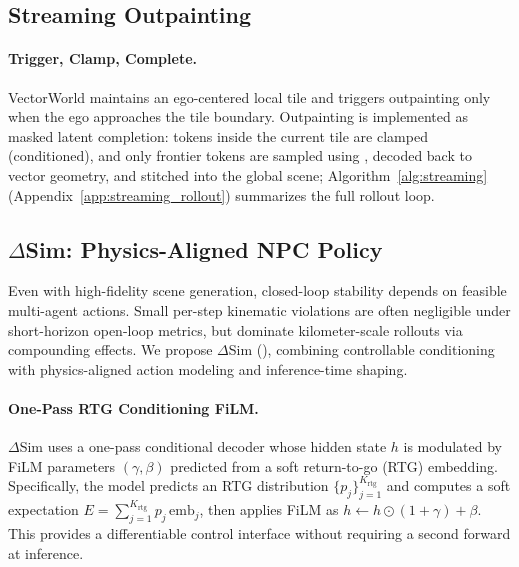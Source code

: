 \documentclass{article}
\theoremstyle{plain}
\theoremstyle{definition}
\theoremstyle{remark}
\begin{document}
\subsection{Streaming Outpainting}
\label{sec:streaming}

\paragraph{Trigger, Clamp, Complete.}
VectorWorld maintains an ego-centered local tile and triggers outpainting only when the ego approaches the tile boundary.
Outpainting is implemented as masked latent completion:
tokens inside the current tile are clamped (conditioned), and only frontier tokens are sampled using , decoded back to vector geometry, and stitched into the global scene; Algorithm~\ref{alg:streaming} (Appendix~\ref{app:streaming_rollout}) summarizes the full rollout loop.

\subsection{\(\Delta\)Sim: Physics-Aligned NPC Policy}
\label{sec:deltasim}

Even with high-fidelity scene generation, closed-loop stability depends on feasible multi-agent actions.
Small per-step kinematic violations are often negligible under short-horizon open-loop metrics, but dominate kilometer-scale rollouts via compounding effects. We propose \(\Delta\)Sim (), combining controllable conditioning with physics-aligned action modeling and inference-time shaping.

\paragraph{One-Pass RTG Conditioning FiLM.}
\(\Delta\)Sim uses a one-pass conditional decoder whose hidden state \(h\) is modulated by FiLM \cite{perez2018film}
parameters \((\gamma,\beta)\) predicted from a soft return-to-go (RTG) embedding.
Specifically, the model predicts an RTG distribution \(\{p_j\}_{j=1}^{K_{\mathrm{rtg}}}\) and computes a soft expectation
\(E=\sum_{j=1}^{K_{\mathrm{rtg}}} p_j\,\mathrm{emb}_j\),
then applies FiLM as \(h \leftarrow h\odot(1+\gamma)+\beta\).
This provides a differentiable control interface without requiring a second forward at inference.
\end{document}

